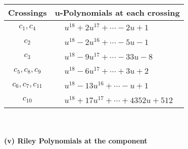 \documentclass[1p]{elsarticle_modified}
\theoremstyle{definition}
\begin{document}
\begin{tabular}{m{50pt}|m{274pt}}
Crossings & \hspace{64pt}u-Polynomials at each crossing \\
\hline $$\begin{aligned}c_{1},c_{4}\end{aligned}$$&$\begin{aligned}
&u^{18}+2 u^{17}+\cdots-2 u+1
\end{aligned}$\\
\hline $$\begin{aligned}c_{2}\end{aligned}$$&$\begin{aligned}
&u^{18}-2 u^{16}+\cdots-5 u-1
\end{aligned}$\\
\hline $$\begin{aligned}c_{3}\end{aligned}$$&$\begin{aligned}
&u^{18}-9 u^{17}+\cdots-33 u-8
\end{aligned}$\\
\hline $$\begin{aligned}c_{5},c_{8},c_{9}\end{aligned}$$&$\begin{aligned}
&u^{18}-6 u^{17}+\cdots+3 u+2
\end{aligned}$\\
\hline $$\begin{aligned}c_{6},c_{7},c_{11}\end{aligned}$$&$\begin{aligned}
&u^{18}-13 u^{16}+\cdots- u+1
\end{aligned}$\\
\hline $$\begin{aligned}c_{10}\end{aligned}$$&$\begin{aligned}
&u^{18}+17 u^{17}+\cdots+4352 u+512
\end{aligned}$\\
\hline
\end{tabular}\\~\\
\newpage\renewcommand{\arraystretch}{1}
\flushleft \textbf{(v) Riley Polynomials at the component}\newline \\
\end{document}
